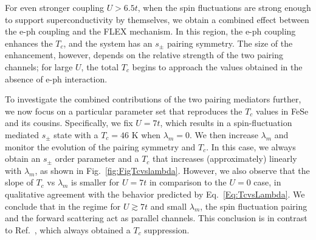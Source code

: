 \documentclass[%
 reprint,
 superscriptaddress,
nofootinbib,
nobibnotes,
 amsmath,amssymb,
 aps,
 prb,
 dvipsnames, 
 floatfix
]{revtex4-2}
\newcommand{\eph}{e-ph}
\begin{document}
For even stronger coupling $U>6.5t$, when the spin fluctuations are strong enough to support superconductivity by themselves, we obtain a combined effect between the {\eph} coupling and the FLEX mechanism. In this region, the {\eph} coupling enhances the $T_c$, and the system has an $s_\pm$ pairing symmetry. The size of the enhancement, however, depends on the relative strength of the two pairing channels; for large $U$, the total $T_c$ begins to approach the values obtained in the absence of {\eph} interaction. 

To investigate the combined contributions of the two pairing mediators further, we now focus on a particular parameter set that reproduces the $T_c$ values in FeSe and its cousins. Specifically, we fix $U = 7t$, which results in a spin-fluctuation mediated $s_\pm$ state with a $T_c = 46$ K when $\lambda_m = 0$. We then increase $\lambda_m$ and monitor the evolution of the pairing symmetry and $T_c$. In this case, we always obtain an $s_\pm$ order parameter and a $T_c$ that increases (approximately) linearly with $\lambda_m$, as shown in Fig.~\ref{fig:FigTcvslambda}. However, we also observe that the slope of $T_c$ vs $\lambda_m$ is smaller for $U = 7t$ in comparison to the $U =  0$ case, in qualitative agreement with the behavior predicted by Eq.~\eqref{Eq:TcvsLambda}. We conclude that in the regime for $U \gtrsim 7t$ and small $\lambda_m$, the spin fluctuation pairing and the forward scattering act as parallel channels. This conclusion is in contrast to Ref.~\cite{Schrodi:2020bq}, which always obtained a $T_c$ suppression. 
\end{document}

